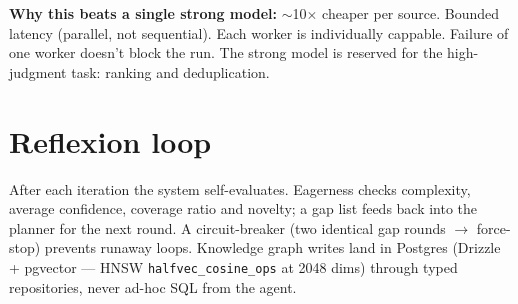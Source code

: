 \textbf{Why this beats a single strong model:} $\sim$10$\times$ cheaper per source. Bounded latency (parallel, not sequential). Each worker is individually cappable. Failure of one worker doesn't block the run. The strong model is reserved for the high-judgment task: ranking and deduplication.

\section{Reflexion loop}

After each iteration the system self-evaluates. Eagerness checks complexity, average confidence, coverage ratio and novelty; a gap list feeds back into the planner for the next round. A circuit-breaker (two identical gap rounds $\to$ force-stop) prevents runaway loops. Knowledge graph writes land in Postgres (Drizzle + pgvector --- HNSW \texttt{halfvec\_cosine\_ops} at 2048 dims) through typed repositories, never ad-hoc SQL from the agent.


